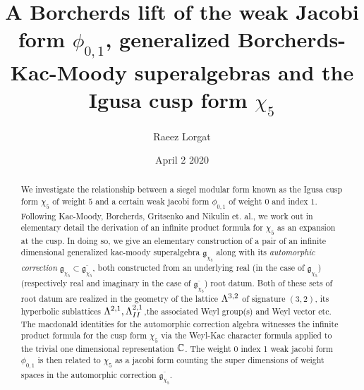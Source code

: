 \documentclass[9pt]{amsart} \usepackage[utf8]{inputenc}
\title{A Borcherds lift of the weak Jacobi form $\phi_{0,1}$,
generalized Borcherds-Kac-Moody superalgebras and the Igusa cusp form $\chi_5$}
\author{Raeez Lorgat } \date{April 2 2020}
\begin{document}
\maketitle

\begin{abstract} We investigate the relationship between a siegel
modular form known as the Igusa cusp form $\chi_5$ of weight $5$ and a
certain weak jacobi form $\phi_{0,1}$ of weight $0$ and index $1$. Following
Kac-Moody, Borcherds, Gritsenko and Nikulin et. al., we work out in
elementary detail the derivation of an infinite product formula for
$\chi_5$ as an expansion at the cusp. In doing so, we give an elementary
construction of a pair of an infinite dimensional generalized kac-moody
superalgebra $\mathfrak{g}_{\chi_5}$ along with its \textit{automorphic
correction} $\mathfrak{g}_{\chi_5}\subset
\overline{\mathfrak{g}_{\chi_5}}$, both constructed from an underlying
real (in the case of $\mathfrak{g}_{\chi_5}$) (respectively real and
imaginary in the case of $\overline{\mathfrak{g}_{\chi_5}}$) root datum.
Both of these sets of root datum are realized in the geometry of the
lattice $\Lambda^{3,2}$ of signature $(3,2)$, its hyperbolic
sublattices $\Lambda^{2,1}, \Lambda^{2,1}_{II}$,the associated Weyl group(s) and
Weyl vector etc. The macdonald identities for the automorphic correction
algebra witnesses the infinite product formula for the cusp form
$\chi_5$ via the Weyl-Kac character formula applied to the trivial one
dimensional representation $\mathbb{C}$. The weight 0 index 1 weak jacobi form
$\phi_{0,1}$ is then related to $\chi_5$ as a jacobi form counting the
super dimensions of weight spaces in the automorphic
correction $\overline{\mathfrak{g}_{\chi_5}}$.  \end{abstract}
\end{document}
